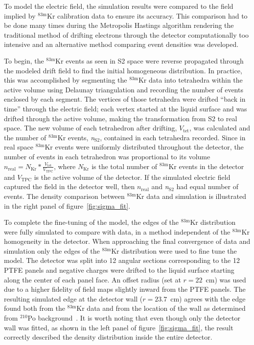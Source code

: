 \documentclass[11pt,a4paper]{article}
\newcommand{\isot}[2]{$^{\textrm{#2}}$#1 }
\newcommand{\krm}{\isot{Kr}{83m}}
\newcommand{\subStwo}{$_{\textrm{S2}}$}
\begin{document}
To model the electric field, the simulation results were compared to the field implied by \krm calibration data to ensure its accuracy. This comparison had to be done many times during the Metropolis Hastings algorithm rendering the traditional method of drifting electrons through the detector computationally too intensive and an alternative method comparing event densities was developed. 

To begin, the \krm events as seen in S2 space were reverse propagated through the modeled drift field to find the initial homogeneous distribution. In practice, this was accomplished by segmenting the \krm data into tetrahedra within the active volume using Delaunay triangulation and recording the number of events enclosed by each segment. The vertices of those tetrahedra were drifted ``back in time'' through the electric field; each vertex started at the liquid surface and was drifted through the active volume, making the transformation from S2 to real space. The new volume of each tetrahedron after drifting, $V_\textrm{tet}$, was calculated and the number of \krm events, \textit{n\subStwo}, contained in each tetrahedra recorded. Since in real space \krm events were uniformly distributed throughout the detector, the number of events in each tetrahedron was proportional to its volume $n_\textrm{real} = N_\textrm{Kr}*\frac{V_\textrm{tet}}{V_\textrm{TPC}}$, where $N_\textrm{Kr}$ is the total number of \krm events in the detector and $V_\textrm{TPC}$ is the active volume of the detector. If the simulated electric field captured the field in the detector well, then $n_\textrm{real}$ and \textit{n\subStwo} had equal number of events. The density comparison between \krm data and simulation is illustrated in the right panel of figure~\ref{fig:sigma_fit}.

To complete the fine-tuning of the model, the edges of the \krm distribution were fully simulated to compare with data, in a method independent of the \krm homogeneity in the detector. When approaching the final convergence of data and simulation only the edges of the \krm distribution were used to fine tune the model. The detector was split into 12 angular sections corresponding to the 12 PTFE panels and negative charges were drifted to the liquid surface starting along the center of each panel face. An offset radius (set at $r=22$~cm) was used due to a higher fidelity of field maps slightly inward from the PTFE panels. The resulting simulated edge at the detector wall ($r=23.7$~cm) agrees with the edge found both from the \krm data and from the location of the wall as determined from {\isot{Po}{210}} background~\cite{bg_paper}. It is worth noting that even though only the detector wall was fitted, as shown in the left panel of figure~\ref{fig:sigma_fit}, the result correctly described the density distribution inside the entire detector.
\end{document}
